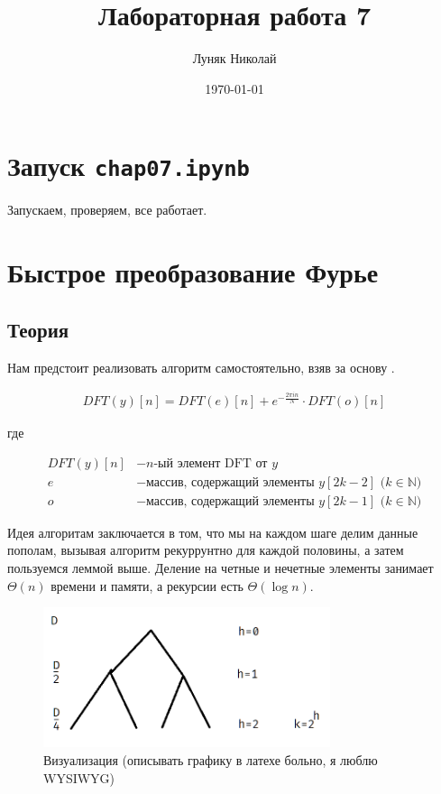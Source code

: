 \documentclass[a4paper,12pt]{report}
\author{Луняк Николай}
\title{Лабораторная работа 7}
\date{\today}
\begin{document}
    \maketitle
    \tableofcontents
    \listoffigures
    \lstlistoflistings
    
    \chapter{Запуск \texttt{chap07.ipynb}}
    
    Запускаем, проверяем, все работает.
    
    \chapter{Быстрое преобразование Фурье}
    \section{Теория}
    
    Нам предстоит реализовать алгоритм самостоятельно, взяв за основу .
    
    \begin{align*}
        DFT(y)[n] = DFT(e)[n] + e^{-\frac{2\pi in}{N}}\cdot DFT(o)[n]
    \end{align*}
    
    где
    
    \begin{align*}
        DFT(y)[n] &- \text{$n$-ый элемент DFT от $y$} \\
        e &- \text{массив, содержащий элементы $y[2k-2]$ ($k\in\mathbb{N}$)} \\
        o &- \text{массив, содержащий элементы $y[2k-1]$ ($k\in\mathbb{N}$)}
    \end{align*}
    
    Идея алгоритам заключается в том, что мы на каждом шаге делим данные пополам, вызывая алгоритм рекуррунтно для каждой половины, а затем пользуемся леммой выше. Деление на четные и нечетные элементы занимает $\Theta(n)$ времени и памяти, а  рекурсии есть $\Theta(\log{n})$.
    
    \begin{figure}[H]
        \centering
        \includegraphics[width=0.75\textwidth]{images/ex2_tree.png}
        \caption{Визуализация (описывать графику в латехе больно, я люблю WYSIWYG)}
        \label{fig:ex2_tree}
    \end{figure}
    
\end{document}
